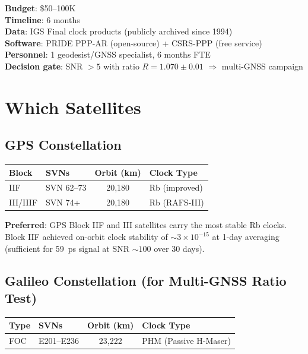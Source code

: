 \documentclass[11pt]{article}
\newcommand{\ee}[1]{\times 10^{#1}}
\begin{document}
\begin{tcolorbox}[colback=green!3!white, colframe=actioncolor,
  title=\textbf{PROTOCOL 2: GPS 59~ps ARCHIVAL --- DETAILED SPECIFICATIONS}]
\textbf{Budget}: \$50--100K\\
\textbf{Timeline}: 6 months\\
\textbf{Data}: IGS Final clock products (publicly archived since 1994)\\
\textbf{Software}: PRIDE PPP-AR (open-source) + CSRS-PPP (free service)\\
\textbf{Personnel}: 1 geodesist/GNSS specialist, 6 months FTE\\
\textbf{Decision gate}: SNR $> 5$ with ratio $R = 1.070 \pm 0.01$
  $\Rightarrow$ multi-GNSS campaign
\end{tcolorbox}

\section{Which Satellites}

\subsection{GPS Constellation}

\begin{center}
\renewcommand{\arraystretch}{1.2}
\begin{tabular}{@{}llcl@{}}
\toprule
\textbf{Block} & \textbf{SVNs} & \textbf{Orbit (km)} & \textbf{Clock Type} \\
\midrule
IIF & SVN 62--73 & 20,180 & Rb (improved) \\
III/IIIF & SVN 74+ & 20,180 & Rb (RAFS-III) \\
\bottomrule
\end{tabular}
\end{center}

\textbf{Preferred}: GPS Block IIF and III satellites carry the most
stable Rb clocks. Block IIF achieved on-orbit clock stability of
$\sim 3\ee{-15}$ at 1-day averaging (sufficient for 59~ps signal at
SNR $\sim 100$ over 30 days).

\subsection{Galileo Constellation (for Multi-GNSS Ratio Test)}

\begin{center}
\renewcommand{\arraystretch}{1.2}
\begin{tabular}{@{}llcl@{}}
\toprule
\textbf{Type} & \textbf{SVNs} & \textbf{Orbit (km)} & \textbf{Clock Type} \\
\midrule
FOC & E201--E236 & 23,222 & PHM (Passive H-Maser) \\
\bottomrule
\end{tabular}
\end{center}
\end{document}
